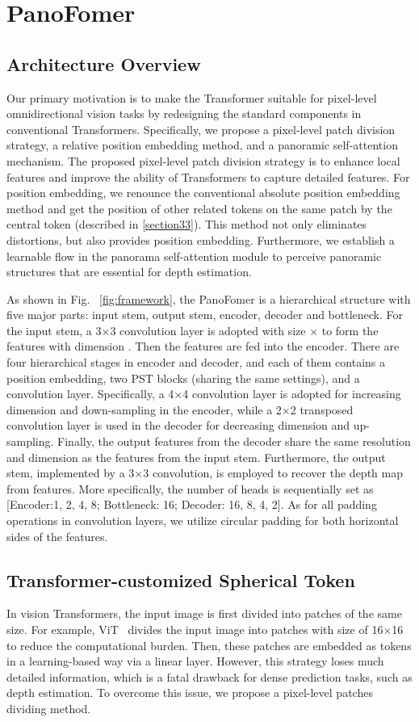 \documentclass[runningheads]{llncs}
\begin{document}
\section{PanoFomer}
\label{section3}
\subsection{Architecture Overview}
\label{section30}
 Our primary motivation is to make the Transformer suitable for pixel-level omnidirectional vision tasks by redesigning the standard components in conventional Transformers. Specifically, we propose a pixel-level patch division strategy, a relative position embedding method, and a panoramic self-attention mechanism. The proposed pixel-level patch division strategy is to enhance local features and improve the ability of Transformers to capture detailed features. For position embedding, we renounce the conventional absolute position embedding method and get the position of other related tokens on the same patch by the central token (described in \ref{section33}). This method not only eliminates distortions, but also provides position embedding. Furthermore, we establish a learnable flow in the panorama self-attention module to perceive panoramic structures that are essential for depth estimation. 
 
 As shown in Fig. ~\ref{fig:framework}, the PanoFomer is a hierarchical structure with five major parts: input stem, output stem, encoder, decoder and bottleneck. For the input stem, a 3×3 convolution layer is adopted with size × to form the features with dimension . Then the features are fed into the encoder. There are four hierarchical stages in encoder and decoder, and each of them contains a position embedding, two PST blocks (sharing the same settings), and a convolution layer. Specifically, a 4×4 convolution layer is adopted for increasing dimension and down-sampling in the encoder, while a 2×2 transposed convolution layer is used in the decoder for decreasing dimension and up-sampling. Finally, the output features from the decoder share the same resolution and dimension as the features from the input stem. Furthermore, the output stem, implemented by a 3×3 convolution, is employed to recover the depth map from features. More specifically, the number of heads is sequentially set as [Encoder:1, 2, 4, 8; Bottleneck: 16; Decoder: 16, 8, 4, 2]. As for all padding operations in convolution layers, we utilize circular padding for both horizontal sides of the features.
  
\subsection{Transformer-customized Spherical Token}\label{section31}
 In vision Transformers, the input image is first divided into patches of the same size. For example, ViT~\cite{dosovitskiy2020image} divides the input image into patches with size of 16×16 to reduce the computational burden. Then, these patches are embedded as tokens in a learning-based way via a linear layer. However, this strategy loses much detailed information, which is a fatal drawback for dense prediction tasks, such as depth estimation. To overcome this issue, we propose a pixel-level patches dividing method.
 
\end{document}
